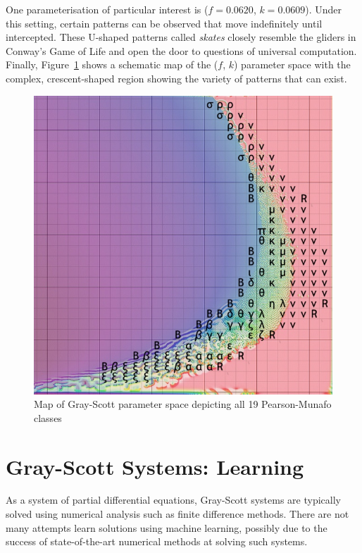 One parameterisation of particular interest is ($f=0.0620$, $k=0.0609$). Under this setting, certain patterns can be observed that move indefinitely until intercepted. These U-shaped patterns called \textit{skates} closely resemble the gliders in Conway's Game of Life and open the door to questions of universal computation.\\

Finally, Figure~\ref{fig:xmorphia} shows a schematic map of the ($f$, $k$) parameter space with the complex, crescent-shaped region showing the variety of patterns that can exist.

\begin{figure}[!h]
\centering
\includegraphics[width=.9\textwidth]{images/munafo/xmorphia.jpg}
\caption{Map of Gray-Scott parameter space depicting all 19 Pearson-Munafo classes \cite{xmorphia}}
\label{fig:xmorphia}
\end{figure}

\section{Gray-Scott Systems: Learning}

As a system of partial differential equations, Gray-Scott systems are typically solved using numerical analysis such as finite difference methods\cite{manaa2013successive}. There are not many attempts learn solutions using machine learning, possibly due to the success of state-of-the-art numerical methods at solving such systems.\\

